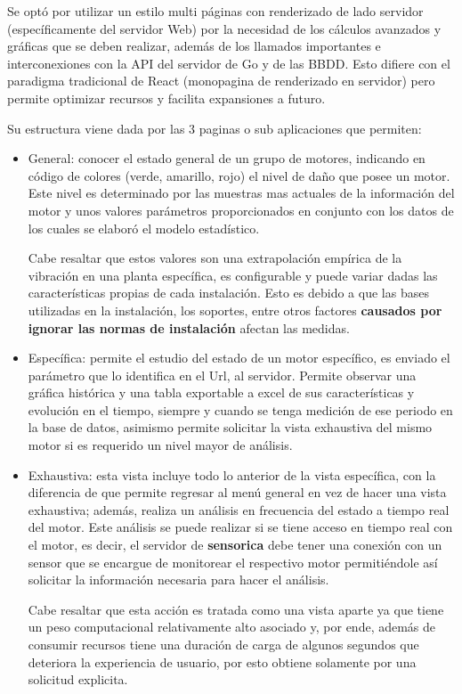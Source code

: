 Se optó por utilizar un
estilo multi páginas con renderizado de lado servidor (específicamente del
servidor Web) por la necesidad de los cálculos avanzados y gráficas que
se deben realizar, además de los llamados importantes e interconexiones con la
API del servidor de Go y de las BBDD. Esto difiere con el paradigma tradicional de
React (monopagina de renderizado en servidor) pero permite optimizar recursos y
facilita expansiones a futuro.

Su estructura viene dada por las 3 paginas o sub aplicaciones que permiten:

\begin{itemize}
    \item General: conocer el estado general de un grupo de motores, indicando
        en código de colores (verde, amarillo, rojo) el nivel de daño que posee
        un motor. Este nivel es determinado por las muestras mas actuales de
        la información del motor y unos valores parámetros proporcionados en
        conjunto con los datos de los cuales se elaboró el modelo estadístico.

        Cabe resaltar que estos valores son una extrapolación empírica de la
        vibración en una planta específica, es configurable y puede variar dadas
        las características propias de cada instalación. Esto es debido a que
        las bases utilizadas en la instalación, los soportes, entre otros factores
        \textbf{causados por ignorar las normas de instalación} afectan las medidas.

    \item Específica:  permite el estudio del estado de un motor específico,
        es enviado el parámetro que lo identifica en el Url, al servidor.
        Permite observar
        una gráfica histórica y una tabla exportable a excel de sus características y
        evolución en el tiempo, siempre y cuando se tenga medición de ese periodo
        en la base de datos, asimismo permite solicitar la vista exhaustiva del
        mismo motor si es requerido un nivel mayor de análisis.

    \item Exhaustiva: esta vista incluye todo lo anterior de la vista específica,
        con la diferencia de que permite regresar al menú general en vez de hacer
        una vista exhaustiva; además, realiza un análisis en frecuencia
        del estado a tiempo real del motor. Este análisis se puede realizar si
        se tiene acceso en tiempo real con el motor, es decir,
        el servidor de \textbf{sensorica} debe tener una conexión con un sensor que se
        encargue de monitorear el respectivo motor permitiéndole así solicitar
        la información necesaria para hacer el análisis.

        Cabe resaltar que esta acción es tratada como una vista aparte ya que
        tiene un peso computacional relativamente alto asociado y, por ende,
        además de consumir recursos tiene una duración de carga de algunos
        segundos que deteriora la experiencia de usuario, por esto
        obtiene solamente por una solicitud explicita.
\end{itemize}




